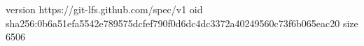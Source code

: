 version https://git-lfs.github.com/spec/v1
oid sha256:0b6a51efa5542e789575dcfef790f0d6dc4dc3372a40249560c73f6b065eac20
size 6506
